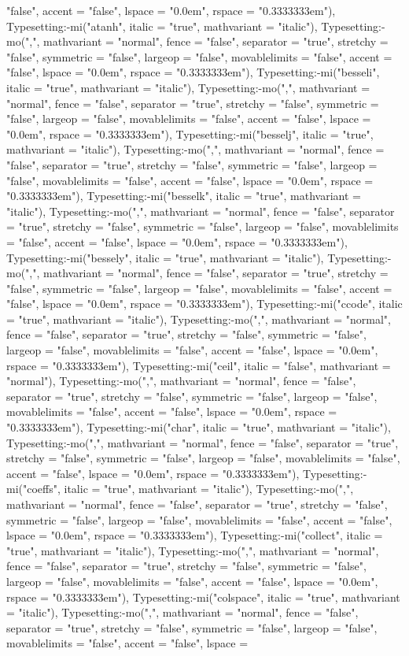 \documentclass{article}
\begin{document}
{{{\begin{maplegroup}
\begin{maplelatex}
"false", accent = "false", lspace = "0.0em", rspace = "0.3333333em"), Typesetting:-mi("atanh", italic = "true", mathvariant = "italic"), Typesetting:-mo(",", mathvariant = "normal", fence = "false", separator = "true", stretchy = "false", symmetric = "false", largeop = "false", movablelimits = "false", accent = "false", lspace = "0.0em", rspace = "0.3333333em"), Typesetting:-mi("besseli", italic = "true", mathvariant = "italic"), Typesetting:-mo(",", mathvariant = "normal", fence = "false", separator = "true", stretchy = "false", symmetric = "false", largeop = "false", movablelimits = "false", accent = "false", lspace = "0.0em", rspace = "0.3333333em"), Typesetting:-mi("besselj", italic = "true", mathvariant = "italic"), Typesetting:-mo(",", mathvariant = "normal", fence = "false", separator = "true", stretchy = "false", symmetric = "false", largeop = "false", movablelimits = "false", accent = "false", lspace = "0.0em", rspace = "0.3333333em"), Typesetting:-mi("besselk", italic = "true", mathvariant = "italic"), Typesetting:-mo(",", mathvariant = "normal", fence = "false", separator = "true", stretchy = "false", symmetric = "false", largeop = "false", movablelimits = "false", accent = "false", lspace = "0.0em", rspace = "0.3333333em"), Typesetting:-mi("bessely", italic = "true", mathvariant = "italic"), Typesetting:-mo(",", mathvariant = "normal", fence = "false", separator = "true", stretchy = "false", symmetric = "false", largeop = "false", movablelimits = "false", accent = "false", lspace = "0.0em", rspace = "0.3333333em"), Typesetting:-mi("ccode", italic = "true", mathvariant = "italic"), Typesetting:-mo(",", mathvariant = "normal", fence = "false", separator = "true", stretchy = "false", symmetric = "false", largeop = "false", movablelimits = "false", accent = "false", lspace = "0.0em", rspace = "0.3333333em"), Typesetting:-mi("ceil", italic = "false", mathvariant = "normal"), Typesetting:-mo(",", mathvariant = "normal", fence = "false", separator = "true", stretchy = "false", symmetric = "false", largeop = "false", movablelimits = "false", accent = "false", lspace = "0.0em", rspace = "0.3333333em"), Typesetting:-mi("char", italic = "true", mathvariant = "italic"), Typesetting:-mo(",", mathvariant = "normal", fence = "false", separator = "true", stretchy = "false", symmetric = "false", largeop = "false", movablelimits = "false", accent = "false", lspace = "0.0em", rspace = "0.3333333em"), Typesetting:-mi("coeffs", italic = "true", mathvariant = "italic"), Typesetting:-mo(",", mathvariant = "normal", fence = "false", separator = "true", stretchy = "false", symmetric = "false", largeop = "false", movablelimits = "false", accent = "false", lspace = "0.0em", rspace = "0.3333333em"), Typesetting:-mi("collect", italic = "true", mathvariant = "italic"), Typesetting:-mo(",", mathvariant = "normal", fence = "false", separator = "true", stretchy = "false", symmetric = "false", largeop = "false", movablelimits = "false", accent = "false", lspace = "0.0em", rspace = "0.3333333em"), Typesetting:-mi("colspace", italic = "true", mathvariant = "italic"), Typesetting:-mo(",", mathvariant = "normal", fence = "false", separator = "true", stretchy = "false", symmetric = "false", largeop = "false", movablelimits = "false", accent = "false", lspace = 
\end{maplelatex}
\end{maplegroup}}}}
\end{document}
